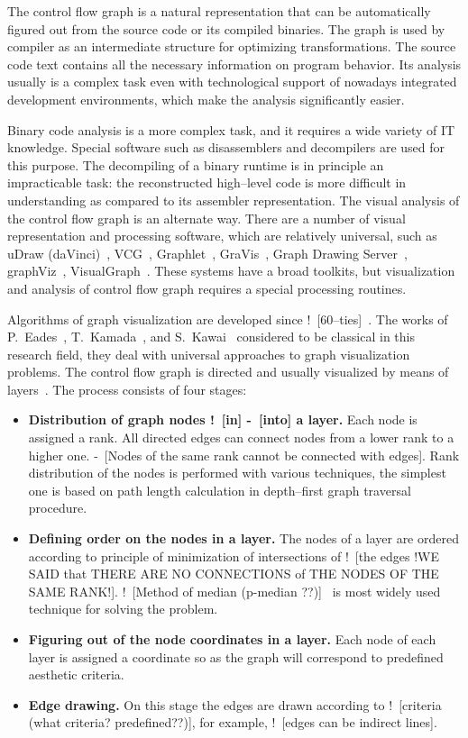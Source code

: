 \documentclass[conference]{IEEEtran}
\newcommand{\rrr}[2][rcolor]{\noindent%
\textcolor{eclr}{-\ [}\textcolor{#1}{#2}\textcolor{eclr}{]}}
\newcommand{\nnn}[2][ncolor]{\noindent%
\textcolor{eclr}{!\ [}\textcolor{#1}{#2}\textcolor{eclr}{]}}
\begin{document}
The control flow graph is a natural representation that can be automatically figured out from the source code or its compiled binaries.  The graph is used by compiler as an intermediate structure for optimizing transformations.  The source code text contains all the necessary information on program behavior.  Its analysis usually is a complex task even with technological support of nowadays integrated development environments, which make the analysis significantly easier.

Binary code analysis is a more complex task, and it requires a wide variety of IT knowledge.  Special software such as disassemblers and decompilers are used for this purpose.  The decompiling of a binary runtime is in principle an impracticable task: the reconstructed high--level code is more difficult in understanding as compared to its assembler representation.  The visual analysis of the control flow graph is an alternate way.  There are a number of visual representation and processing software, which are relatively universal, such as uDraw (daVinci)~\cite{10}, VCG~\cite{14}, Graphlet~\cite{12}, GraVis~\cite{13}, Graph Drawing Server~\cite{9}, graphViz~\cite{11}, VisualGraph~\cite{15}.  These systems have a broad toolkits, but visualization and analysis of control flow graph requires a special processing routines.

Algorithms of graph visualization are developed since \nnn{60--ties}~\cite{7}.  The works of P.~Eades~\cite{5}, T.~Kamada~\cite{q1}, and S.~Kawai~\cite{6} considered to be classical in this research field, they deal with universal approaches to graph visualization problems.  The control flow graph is directed and usually visualized by means of layers~\cite{4}.  The process consists of four stages:
\begin{itemize}
\item \textbf{Distribution of graph nodes \nnn{in}\rrr{into} a layer.} Each node is assigned a rank.  All directed edges can connect nodes from a lower rank to a higher one.  \rrr{Nodes of the same rank cannot be connected with edges}.  Rank distribution of the nodes is performed with various techniques, the simplest one is based on path length calculation in depth--first graph traversal procedure.
\item \textbf{Defining order on the nodes in a layer.} The nodes of a layer are ordered according to principle of minimization of intersections of \nnn{the edges !WE SAID that THERE ARE NO CONNECTIONS of THE NODES OF THE SAME RANK!}.  \nnn{Method of median (p-median ??)}~\cite{8} is most widely used technique for solving the problem.
\item \textbf{Figuring out of the node coordinates in a layer.} Each node of each layer is assigned a coordinate so as the graph will correspond to predefined aesthetic criteria.
\item \textbf{Edge drawing.} On this stage the edges are drawn according to \nnn{criteria (what criteria? predefined??)}, for example, \nnn{edges can be indirect lines}.
\end{itemize}
\end{document}
